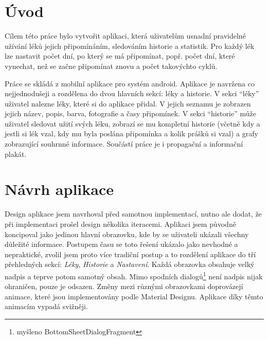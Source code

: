 \documentclass[a4paper,12pt]{report}
\begin{document}

\renewcommand\cftsecafterpnum{\vskip10pt}
\renewcommand\cftsubsecafterpnum{\vskip10pt}
\renewcommand\cftsubsubsecafterpnum{\vskip10pt}
\newpage
\tableofcontents %

\chapter*{Úvod}

Cílem této práce bylo vytvořit aplikaci, která uživatelům usnadní pravidelné užívání léků jejich připomínáním, sledováním historie a statistik. Pro každý lék lze nastavit počet dní, po který se má připomínat, popř. počet dní, které vynechat, než se začne připomínat znovu a počet takovýchto cyklů.

Práce se skládá z mobilní aplikace pro systém android. Aplikace je navržena co nejjednodušeji a rozdělena do dvou hlavních sekcí: léky a historie. V sekci \enquote{léky} uživatel nalezne léky, které si do aplikace přidal. V jejich seznamu je zobrazen jejich název, popis, barva, fotografie a časy připomínek. V sekci \enquote{historie} může uživatel sledovat užití svých léku, zobrazí se mu kompletní historie (včetně kdy a jestli si lék vzal, kdy mu byla poslána připomínka a kolik prášků si vzal) a grafy zobrazující souhrnné informace. Součástí práce je i propagační a informační plakát. 



\chapter{Návrh aplikace}

Design aplikace jsem navrhoval před samotnou implementací, nutno ale dodat, že při implementaci prošel design několika iteracemi. Aplikaci jsem původně koncipoval jako jedinou hlavní obrazovku, kde by se uživateli ukázali všechny důležité informace. Postupem času se toto řešení ukázalo jako nevhodné a nepraktické, zvolil jsem proto více tradiční postup a to rozdělení aplikace do tří přehledných sekcí: \emph{Léky}, \emph{Historie} a \emph{Nastavení}. Každá obrazovka obsahuje velký nadpis a teprve potom samotný obsah. Mimo spodních dialogů\footnote{myšleno BottomSheetDialogFragment} není nadpis nijak ohraničen, pouze je odsazen. Změny mezi různými obrazovkami doprovázejí animace, které jsou implementovány podle Material Designu. Aplikace díky těmto animacím vypadá svižněji.
\end{document}
